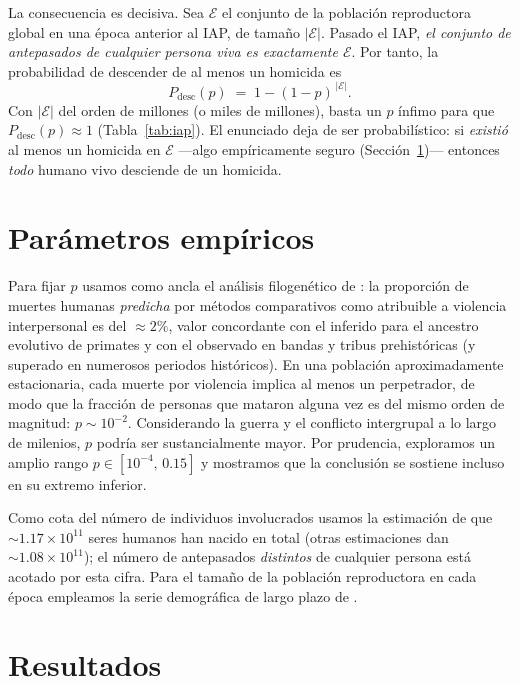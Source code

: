 \documentclass[11pt]{article}
\begin{document}
La consecuencia es decisiva. Sea $\mathcal{E}$ el conjunto de la poblaci\'on
reproductora global en una \'epoca anterior al IAP, de tama\~no $|\mathcal{E}|$.
Pasado el IAP, \emph{el conjunto de antepasados de cualquier persona viva es
exactamente $\mathcal{E}$}. Por tanto, la probabilidad de descender de al menos
un homicida es
\begin{equation}\label{eq:iap}
  P_{\text{desc}}(p) \;=\; 1-(1-p)^{\,|\mathcal{E}|}.
\end{equation}
Con $|\mathcal{E}|$ del orden de millones (o miles de millones), basta un $p$
\'infimo para que $P_{\text{desc}}(p)\approx 1$ (Tabla~\ref{tab:iap}). El
enunciado deja de ser probabil\'istico: si \emph{existi\'o} al menos un homicida
en $\mathcal{E}$ ---algo emp\'iricamente seguro (Secci\'on~\ref{sec:param})---
entonces \emph{todo} humano vivo desciende de un homicida.

\section{Par\'ametros emp\'iricos}\label{sec:param}

Para fijar $p$ usamos como ancla el an\'alisis filogen\'etico de
\citet{gomez2016}: la proporci\'on de muertes humanas \emph{predicha} por
m\'etodos comparativos como atribuible a violencia interpersonal es del
$\approx 2\%$, valor concordante con el inferido para el ancestro evolutivo de
primates y con el observado en bandas y tribus prehist\'oricas (y superado en
numerosos periodos hist\'oricos). En una poblaci\'on aproximadamente
estacionaria, cada muerte por violencia implica al menos un perpetrador, de modo
que la fracci\'on de personas que mataron alguna vez es del mismo orden de
magnitud: $p \sim 10^{-2}$. Considerando la guerra y el conflicto intergrupal a
lo largo de milenios, $p$ podr\'ia ser sustancialmente mayor. Por prudencia,
exploramos un amplio rango $p \in [10^{-4},\, 0{.}15]$ y mostramos que la
conclusi\'on se sostiene incluso en su extremo inferior.

Como cota del n\'umero de individuos involucrados usamos la estimaci\'on de que
$\sim 1{.}17\times 10^{11}$ seres humanos han nacido en total \citep{prb2022}
(otras estimaciones dan $\sim 1{.}08\times 10^{11}$); el n\'umero de antepasados
\emph{distintos} de cualquier persona est\'a acotado por esta cifra. Para el
tama\~no de la poblaci\'on reproductora en cada \'epoca empleamos la serie
demogr\'afica de largo plazo de \citet{owid2023population}.

\section{Resultados}
\end{document}
